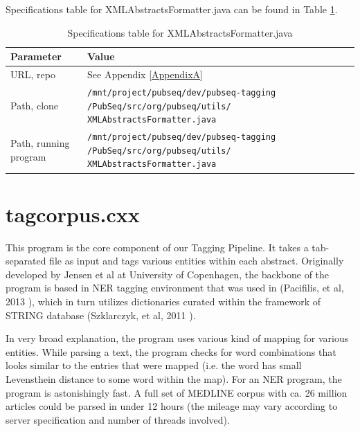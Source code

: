 Specifications table for XMLAbstractsFormatter.java can be found in Table \ref{tab:XMLAbstractsFormatter}.

\begin{table}[htbp]
\caption{Specifications table for XMLAbstractsFormatter.java}
\centering
\begin{tabularx}{\textwidth}{ | l | X | }
  \hline
  Parameter & Value \\
  \hline
  URL, repo & See Appendix \ref{AppendixA} \\
  Path, clone & \texttt{/mnt/project/pubseq/dev/pubseq-tagging /PubSeq/src/org/pubseq/utils/ XMLAbstractsFormatter.java} \\
  Path, running program & \texttt{/mnt/project/pubseq/dev/pubseq-tagging /PubSeq/src/org/pubseq/utils/ XMLAbstractsFormatter.java} \\
  \hline
\end{tabularx}
\label{tab:XMLAbstractsFormatter}
\end{table}


\section{tagcorpus.cxx}

This program is the core component of our Tagging Pipeline. It takes a tab-separated file as input and tags various entities within each abstract. Originally developed by Jensen et al at University of Copenhagen, the backbone of the program is based in NER tagging environment that was used in (Pacifilis, et al, 2013 \citep{pafilis2013species}), which in turn utilizes dictionaries curated within the framework of STRING database (Szklarczyk, et al, 2011 \citep{szklarczyk2011string}).

In very broad explanation, the program uses various kind of mapping for various entities. While parsing a text, the program checks for word combinations that looks similar to the entries that were mapped (i.e. the word has small Levensthein distance \citep{levenshtein1966binary} to some word within the map). For an NER program, the program is astonishingly fast. A full set of MEDLINE corpus with ca. 26 million articles could be parsed in under 12 hours (the mileage may vary according to server specification and number of threads involved).

